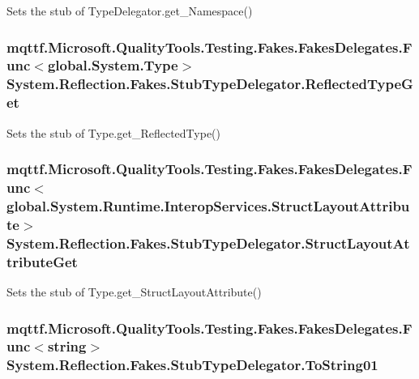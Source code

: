 Sets the stub of Type\-Delegator.\-get\-\_\-\-Namespace()

\hypertarget{class_system_1_1_reflection_1_1_fakes_1_1_stub_type_delegator_a855e96c54b8df341da23e9bcc9655304}{
\subsubsection[{Reflected\-Type\-Get}]{\setlength{\rightskip}{0pt plus 5cm}mqttf.\-Microsoft.\-Quality\-Tools.\-Testing.\-Fakes.\-Fakes\-Delegates.\-Func$<$global.\-System.\-Type$>$ System.\-Reflection.\-Fakes.\-Stub\-Type\-Delegator.\-Reflected\-Type\-Get}}\label{class_system_1_1_reflection_1_1_fakes_1_1_stub_type_delegator_a855e96c54b8df341da23e9bcc9655304}


Sets the stub of Type.\-get\-\_\-\-Reflected\-Type()

\hypertarget{class_system_1_1_reflection_1_1_fakes_1_1_stub_type_delegator_a6e6bf099e556a94d430ec416f5173410}{
\subsubsection[{Struct\-Layout\-Attribute\-Get}]{\setlength{\rightskip}{0pt plus 5cm}mqttf.\-Microsoft.\-Quality\-Tools.\-Testing.\-Fakes.\-Fakes\-Delegates.\-Func$<$global.\-System.\-Runtime.\-Interop\-Services.\-Struct\-Layout\-Attribute$>$ System.\-Reflection.\-Fakes.\-Stub\-Type\-Delegator.\-Struct\-Layout\-Attribute\-Get}}\label{class_system_1_1_reflection_1_1_fakes_1_1_stub_type_delegator_a6e6bf099e556a94d430ec416f5173410}


Sets the stub of Type.\-get\-\_\-\-Struct\-Layout\-Attribute()

\hypertarget{class_system_1_1_reflection_1_1_fakes_1_1_stub_type_delegator_a6db23643469919668de414ba8144c7fa}{
\subsubsection[{To\-String01}]{\setlength{\rightskip}{0pt plus 5cm}mqttf.\-Microsoft.\-Quality\-Tools.\-Testing.\-Fakes.\-Fakes\-Delegates.\-Func$<$string$>$ System.\-Reflection.\-Fakes.\-Stub\-Type\-Delegator.\-To\-String01}}\label{class_system_1_1_reflection_1_1_fakes_1_1_stub_type_delegator_a6db23643469919668de414ba8144c7fa}


